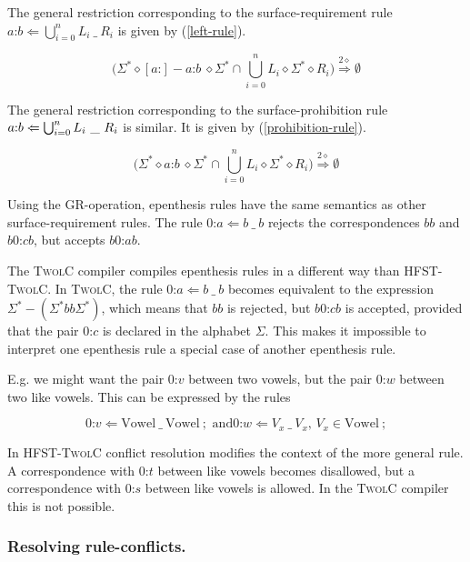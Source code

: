 \documentclass[postprint]{flammie}
\begin{document}
The general restriction corresponding to the surface-requirement rule
$a\text{:}b \Leftarrow \bigcup_{i=0}^n L_i\ \_\ R_i$ is given by
(\ref{left-rule}).

\begin{equation}
  \label{left-rule}
  \Big( \Sigma^* \diamond [a\text{:}] - a\text{:}b\ \diamond\Sigma^*
  \cap \bigcup_{i=0}^n L_i\diamond\Sigma^*\diamond R_i \Big)
  \overset{2\diamond}{\Rightarrow} \emptyset
\end{equation}

The general restriction corresponding to the surface-prohibition rule
$a\text{:}b \/\Leftarrow \bigcup_{i=0}^n L_i\ \_\ R_i$ is similar. It
is given by (\ref{prohibition-rule}).

\begin{equation}
  \label{prohibition-rule}
  \Big( \Sigma^* \diamond a\text{:}b\ \diamond\Sigma^* \cap
  \bigcup_{i=0}^n L_i\diamond\Sigma^*\diamond R_i \Big)
  \overset{2\diamond}{\Rightarrow} \emptyset
\end{equation}

Using the GR-operation, epenthesis rules have the same semantics as
other surface-requirement rules. The rule $0\text{:}a \Leftarrow b\
\_\ b$ rejects the correspondences $bb$ and $b0\text{:}cb$, but accepts
$b0\text{:}ab$.

The \textsc{TwolC} compiler compiles epenthesis rules in a different
way than \textsc{HFST-TwolC}. In \textsc{TwolC}, the rule $0\text{:}a
\Leftarrow b\ \_\ b$ becomes equivalent to the expression $\Sigma^* -
( \Sigma^* b b\Sigma^*)$, which means that $bb$ is rejected, but
$b0\text{:}cb$ is accepted, provided that the pair $0\text{:}c$ is
declared in the alphabet $\Sigma$. This makes it impossible to
interpret one epenthesis rule a special case of another epenthesis
rule.

E.g. we might want the pair $0\text{:}v$ between two vowels, but the pair
$0\text{:}w$ between two like vowels. This can be expressed by the rules

$$0\text{:}v \Leftarrow \text{Vowel}\ \_\ \text{Vowel}\ ;\text{ and
}0\text{:}w \Leftarrow V_x\ \_\ V_x\text{, }V_x \in \text{Vowel}\ ;$$

In \textsc{HFST-TwolC} conflict resolution modifies the context of the
more general rule. A correspondence with $0\text{:}t$ between like
vowels becomes disallowed, but a correspondence with $0\text{:}s$
between like vowels is allowed. In the \textsc{TwolC} compiler this is
not possible.
 
\subsubsection{Resolving rule-conflicts.}
\label{twolc-conflict-resolution}
\end{document}
